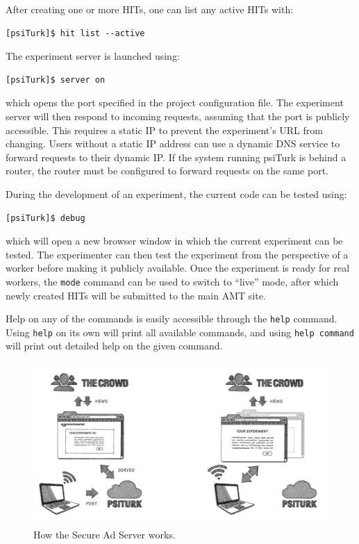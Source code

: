 \documentclass[twocolumn]{svjour3}          %
\newcommand{\psiturk}[0]{\textsf{psiTurk}}
\begin{document}
After creating one or more HITs, one can list any active HITs with:

\begin{lstlisting}
[psiTurk]$ hit list --active
\end{lstlisting}

The experiment server is launched using:

\begin{lstlisting}
[psiTurk]$ server on
\end{lstlisting}

\noindent which opens the port specified in the project configuration file.
The experiment server will then respond to incoming requests, assuming that the port is publicly accessible.
This requires a static IP to prevent the experiment's URL from changing.
Users without a static IP address can use a dynamic DNS service to forward requests to their dynamic IP.
If the system running \psiturk{} is behind a router, the router must be configured to forward requests on the same port.

During the development of an experiment, the current code can be tested using:

\begin{lstlisting}
[psiTurk]$ debug
\end{lstlisting}

\noindent which will open a new browser window in which the current experiment can be tested. The experimenter can then test the experiment from the perspective of a worker before making it publicly available.
Once the experiment is ready for real workers, the \texttt{mode} command can be used to switch to ``live'' mode, after which newly created HITs will be submitted to the main AMT site.

Help on any of the commands is easily accessible through the \texttt{help} command. Using \texttt{help} on its own will print all available commands, and using \texttt{help command} will print out detailed help on the given command.

\begin{figure}[tp]
\centering
\includegraphics[scale=.40]{figures/psiturk_cloud_sequence.jpg}
\caption{How the Secure Ad Server works.}
\label{fig:adserver}
\end{figure}
\end{document}
